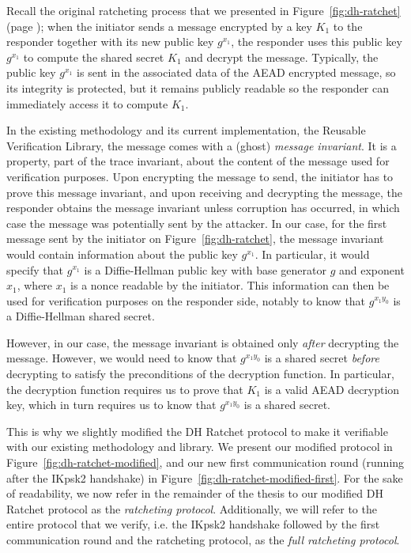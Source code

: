 Recall the original ratcheting process that we presented in Figure~\ref{fig:dh-ratchet} (page \pageref{fig:dh-ratchet}); when the initiator sends a message encrypted by a key $K_1$ to the responder together with its new public key $g^{x_1}$, the responder uses this public key $g^{x_1}$ to compute the shared secret $K_1$ and decrypt the message.
Typically, the public key $g^{x_1}$ is sent in the associated data of the AEAD encrypted message, so its integrity is protected, but it remains publicly readable so the responder can immediately access it to compute $K_1$.

In the existing methodology and its current implementation, the Reusable Verification Library, the message comes with a (ghost) \emph{message invariant}. It is a property, part of the trace invariant, about the content of the message used for verification purposes. Upon encrypting the message to send, the initiator has to prove this message invariant, and upon receiving and decrypting the message, the responder obtains the message invariant unless corruption has occurred, in which case the message was potentially sent by the attacker.
In our case, for the first message sent by the initiator on Figure~\ref{fig:dh-ratchet}, the message invariant would contain information about the public key $g^{x_1}$. In particular, it would specify that $g^{x_1}$ is a Diffie-Hellman public key with base generator $g$ and exponent $x_1$, where $x_1$ is a nonce readable by the initiator.
This information can then be used for verification purposes on the responder side, notably to know that $g^{x_1y_0}$ is a Diffie-Hellman shared secret.

However, in our case, the message invariant is obtained only \emph{after} decrypting the message.
However, we would need to know that $g^{x_1y_0}$ is a shared secret \emph{before} decrypting to satisfy the preconditions of the decryption function.
In particular, the decryption function requires us to prove that $K_1$ is a valid AEAD decryption key, which in turn requires us to know that $g^{x_1y_0}$ is a shared secret.

This is why we slightly modified the DH Ratchet protocol to make it verifiable with our existing methodology and library.
We present our modified protocol in Figure~\ref{fig:dh-ratchet-modified}, and our new first communication round (running after the IKpsk2 handshake) in Figure~\ref{fig:dh-ratchet-modified-first}.
For the sake of readability, we now refer in the remainder of the thesis to our modified DH Ratchet protocol as the \emph{ratcheting protocol}. Additionally, we will refer to the entire protocol that we verify, i.e. the IKpsk2 handshake followed by the first communication round and the ratcheting protocol, as the \emph{full ratcheting protocol}.

